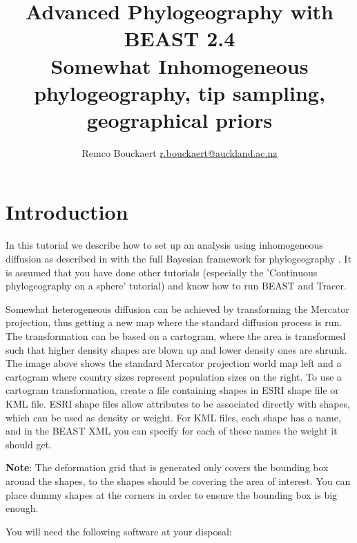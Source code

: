 \documentclass{article}
\newcommand{\BEASTVersion}{2.4}
\begin{document}
\title{Advanced Phylogeography with BEAST \BEASTVersion\\
    {\small Somewhat Inhomogeneous phylogeography, tip sampling, geographical priors}}
\author{Remco Bouckaert \url{r.bouckaert@auckland.ac.nz}}
\maketitle

\section{Introduction}


In this tutorial we describe how to set up an analysis using inhomogeneous diffusion as described in  \cite{somewhatIP} with the full Bayesian framework for phylogeography \cite{sphericalgeo}. It is assumed that you have done other tutorials (especially the 'Continuous phylogeography on a sphere' tutorial) and know how to run BEAST and Tracer.

Somewhat heterogeneous diffusion can be achieved by transforming the Mercator projection, thus getting a new map where the standard diffusion process is run. The transformation can be based on a cartogram, where the area is transformed such that higher density shapes are blown up and lower density ones are shrunk. The image above shows the standard Mercator projection world map left and a cartogram where country sizes represent population sizes on the right. To use a cartogram transformation, create a file containing shapes in ESRI shape file or KML file. ESRI shape files allow attributes to be associated directly with shapes, which can be used as density or weight. For KML files, each shape has a name, and in the BEAST XML you can specify for each of these names the weight it should get.

{\bf Note}: The deformation grid that is generated only covers the bounding box around the shapes, to the shapes should be covering the area of interest. You can place dummy shapes at the corners in order to ensure the bounding box is big enough.

You will need the following software at your disposal:
\end{document}
